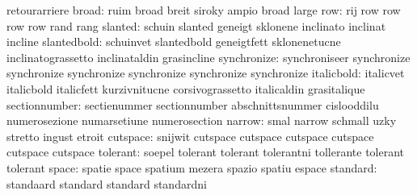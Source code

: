                            retourarriere
                    broad: ruim                      broad
                           breit                     siroky
                           ampio                     broad
                           large
                      row: rij                       row
                           row                       row
                           row                       rand
                           rang
                  slanted: schuin                    slanted
                           geneigt                   sklonene
                           inclinato                 inclinat
                           incline
              slantedbold: schuinvet                 slantedbold
                           geneigtfett               sklonenetucne
                           inclinatograssetto        inclinataldin
                           grasincline
              synchronize: synchroniseer             synchronize
                           synchronize               synchronize
                           synchronize               synchronize
                           synchronize
               italicbold: italicvet                 italicbold
                           italicfett                kurzivnitucne
                           corsivograssetto          italicaldin
                           grasitalique
            sectionnumber: sectienummer              sectionnumber
                           abschnittsnummer          cislooddilu
                           numerosezione             numarsetiune
                           numerosection
                   narrow: smal                      narrow
                           schmall                   uzky
                           stretto                   ingust
                           etroit
                 cutspace: snijwit                   cutspace
                           cutspace                  cutspace
                           cutspace                  cutspace
                           cutspace
                 tolerant: soepel                    tolerant
                           tolerant                  tolerantni
                           tollerante                tolerant
                           tolerant
                    space: spatie                    space
                           spatium                   mezera
                           spazio                    spatiu
                           espace
                 standard: standaard                 standard
                           standard                  standardni
